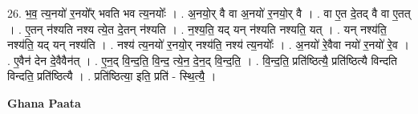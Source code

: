 \documentclass[17pt]{extarticle}
\begin{document}
26. भ॒व॒ त्य॒नयो॑ र॒नयो᳚र् भवति भव त्य॒नयोः᳚ । . अ॒नयो॒र् वै वा अ॒नयो॑ र॒नयो॒र् वै । . वा ए॒त दे॒तद् वै वा ए॒तत् । . ए॒तन् न॑श्यति नश्य त्ये॒त दे॒तन् न॑श्यति । . न॒श्य॒ति॒ यद् यन् न॑श्यति नश्यति॒ यत् । . यन् नश्य॑ति॒ नश्य॑ति॒ यद् यन् नश्य॑ति । . नश्य॑ त्य॒नयो॑ र॒नयो॒र् नश्य॑ति॒ नश्य॑ त्य॒नयोः᳚ । . अ॒नयो॑ रे॒वैवा नयो॑ र॒नयो॑ रे॒व । . ए॒वैन॑ देन दे॒वैवैन॑त् । . ए॒न॒द् वि॒न्द॒ति॒ वि॒न्द॒ त्ये॒न॒ दे॒न॒द् वि॒न्द॒ति॒ । . वि॒न्द॒ति॒ प्रति॑ष्ठित्यै॒ प्रति॑ष्ठित्यै विन्दति विन्दति॒ प्रति॑ष्ठित्यै । . प्रति॑ष्ठित्या॒ इति॒ प्रति॑ - स्थि॒त्यै॒ । \newline

\textbf{Ghana Paata } \newline
\end{document}
